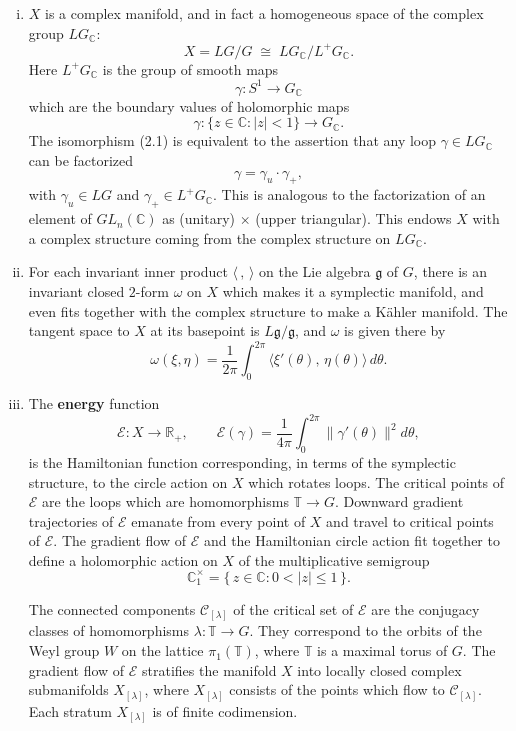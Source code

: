 \documentclass[12pt]{article}
\begin{document}
\begin{enumerate}[(i)]
\item
\(X\) is a complex manifold, and in fact a homogeneous space of the complex group \(LG_{\mathbb{C}}\):
\[
X = LG/G \;\cong\; LG_{\mathbb{C}} / L^+G_{\mathbb{C}}. \tag{2.1}
\]
Here \(L^+G_{\mathbb{C}}\) is the group of smooth maps 
\[
\gamma : S^1 \longrightarrow G_{\mathbb{C}}
\]
which are the boundary values of holomorphic maps
\[
\gamma : \{ z \in \mathbb{C} : |z| < 1 \} \longrightarrow G_{\mathbb{C}}.
\]
The isomorphism (2.1) is equivalent to the assertion that any loop 
\(\gamma \in LG_{\mathbb{C}}\) can be factorized
\[
\gamma = \gamma_u \cdot \gamma_+,
\]
with \(\gamma_u \in LG\) and \(\gamma_+ \in L^+G_{\mathbb{C}}\).  
This is analogous to the factorization of an element of \(GL_n(\mathbb{C})\) as 
(unitary) \(\times\) (upper triangular). This endows \(X\) with a complex structure coming from the complex structure on \(LG_{\mathbb{C}}\).

\item
For each invariant inner product \(\langle\, , \,\rangle\) on the Lie algebra \(\mathfrak{g}\) of \(G\),
there is an invariant closed \(2\)-form \(\omega\) on \(X\) which makes it a symplectic manifold, and even fits together with the complex structure to make a Kähler manifold.  
The tangent space to \(X\) at its basepoint is \(L\mathfrak{g}/\mathfrak{g}\),
and \(\omega\) is given there by
\[
\omega(\xi, \eta)
= \frac{1}{2\pi} \int_0^{2\pi} \langle \xi'(\theta),\, \eta(\theta) \rangle\, d\theta.
\tag{2.2}
\]
\item
The \textbf{energy} function
\[
\mathcal{E} : X \longrightarrow \mathbb{R}_+, \qquad
\mathcal{E}(\gamma)
= \frac{1}{4\pi} \int_0^{2\pi} \bigl\| \gamma'(\theta) \bigr\|^2 d\theta,
\]
is the Hamiltonian function corresponding, in terms of the symplectic structure,
to the circle action on \(X\) which rotates loops.
The critical points of \(\mathcal{E}\) are the loops which are homomorphisms
\(\mathbb{T} \to G\).
Downward gradient trajectories of \(\mathcal{E}\) emanate from every point of \(X\)
and travel to critical points of \(\mathcal{E}\).
The gradient flow of \(\mathcal{E}\) and the Hamiltonian circle action fit together
to define a holomorphic action on \(X\) of the multiplicative semigroup
\[
\mathbb{C}_1^{\times} = \{\, z \in \mathbb{C} : 0 < |z| \le 1 \,\}.
\]

The connected components \(\mathcal{C}_{[\lambda]}\) of the critical set of \(\mathcal{E}\)
are the conjugacy classes of homomorphisms
\(\lambda : \mathbb{T} \to G\).
They correspond to the orbits of the Weyl group \(W\) on the lattice
\(\pi_1(\mathbb{T})\), where \(\mathbb{T}\) is a maximal torus of \(G\).
The gradient flow of \(\mathcal{E}\) stratifies the manifold \(X\)
into locally closed complex submanifolds \(X_{[\lambda]}\),
where \(X_{[\lambda]}\) consists of the points which flow to \(\mathcal{C}_{[\lambda]}\).
Each stratum \(X_{[\lambda]}\) is of finite codimension. 
\begin{proposition}
    

\end{proposition}
\end{enumerate}
\end{document}
